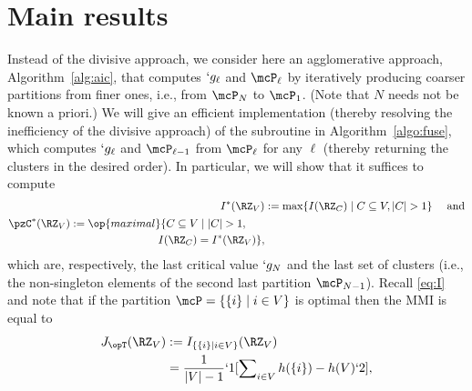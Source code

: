 \section{Main results}
\label{sec:agglom}

Instead of the divisive approach, we consider here an agglomerative approach, 
Algorithm~\ref{alg:aic}, that computes $`g_{\ell}$ and $\mcP_{\ell}$ by iteratively producing coarser partitions from finer ones, i.e., from $\mcP_N$ to $\mcP_1$. 
(Note that $N$ needs not be known a priori.)
We will give an efficient implementation (thereby resolving the inefficiency of the divisive
approach) of the subroutine \Agglomerate in Algorithm~\ref{algo:fuse}, which computes $`g_\ell$ and
$\mcP_{\ell-1}$ from $\mcP_{\ell}$ for any $\ell$ (thereby returning the clusters in the desired order).
In particular, we will show that it suffices to compute
\begin{subequations}
	\label{eq:IC*}
\begin{align}
	I^*(\RZ_V)&:=\max\{I(\RZ_{C})\mid C\subseteq V, \abs {C} > 1\} \kern1em \text{ and}\label{eq:I*}\\
	\begin{split}
	\pzC^*(\RZ_V)&:=\op{maximal}\{C\subseteq V \mid \abs{C} > 1, \\
	&\kern8em I(\RZ_C) = I^{*}(\RZ_{V})  \},
	\end{split}\label{eq:C*}
\end{align}
\end{subequations}
which are, respectively, the last critical value $`g_{N}$  \cite[Theorem~1]{chan16cluster} and the last set of clusters (i.e., the non-singleton elements of the second last
partition $\mcP_{N-1}$).
Recall 
\eqref{eq:I} 
and note that 
if the partition $\mcP=\Set {\Set {i}\mid i\in V}$ is
optimal
then the MMI is equal to
\begin{align}
	\label{eq:JT}
	\begin{split}
		J_{\opT}(\RZ_V)
		&:=I_{\Set{\Set{i}\mid i\in V}}(\RZ_V)\\
		&=\frac1 {\abs{V}-1}`1[\sum\nolimits_{i \in V}h(\Set{i})-h(V)`2],
	\end{split}
\end{align}
